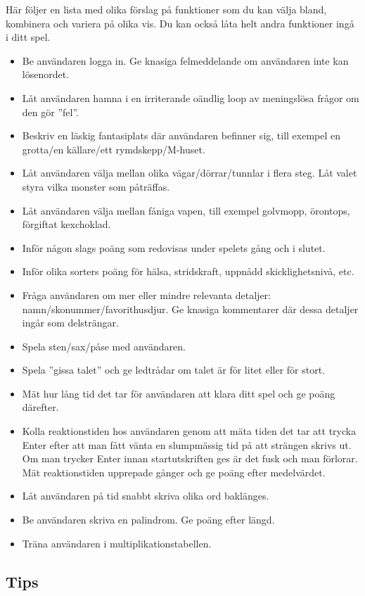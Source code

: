 Här följer en lista med olika förslag på funktioner som du kan välja bland, kombinera och variera på olika vis. Du kan också låta helt andra funktioner ingå i ditt spel.

\begin{itemize}
\item Be användaren logga in. Ge knasiga felmeddelande om användaren inte kan lösenordet.
\item Låt användaren hamna i en irriterande oändlig loop av meningslösa frågor om den gör ''fel''.
\item Beskriv en läskig fantasiplats där användaren befinner sig, till exempel en grotta/en källare/ett rymdskepp/M-huset.
\item Låt användaren välja mellan olika vägar/dörrar/tunnlar i flera steg. Låt valet styra vilka monster som påträffas.
\item Låt användaren välja mellan fåniga vapen, till exempel golvmopp, örontops, förgiftat kexchoklad.
\item Inför någon slags poäng som redovisas under spelets gång och i slutet.
\item Inför olika sorters poäng för hälsa, stridskraft, uppnådd skicklighetsnivå, etc.
\item Fråga användaren om mer eller mindre relevanta detaljer: namn/skonummer/favorithusdjur. Ge knasiga kommentarer där dessa detaljer ingår som delsträngar.
\item Spela sten/sax/påse med användaren.
\item Spela ''gissa talet'' och ge ledtrådar om talet är för litet eller för stort.
\item Mät hur lång tid det tar för användaren att klara ditt spel och ge poäng därefter.
\item Kolla reaktionstiden hos användaren genom att mäta tiden det tar att trycka Enter efter att man fått vänta en slumpmässig tid på att strängen  skrivs ut. Om man trycker Enter innan startutskriften ges är det fusk och man förlorar. Mät reaktionstiden upprepade gånger och ge poäng efter medelvärdet.
\item Låt användaren på tid snabbt skriva olika ord baklänges.
\item Be användaren skriva en palindrom. Ge poäng efter längd.
\item Träna användaren i multiplikationstabellen.
\end{itemize}


\subsection{Tips}

